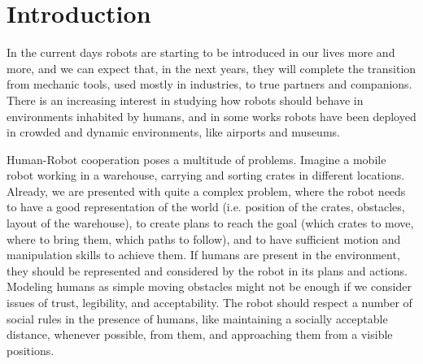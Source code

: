 
\chapter{Introduction} %

\label{chapter-introduction} %



In the current days robots are starting to be introduced in our lives more and more, and we can expect that, in the next years, they will complete the transition from mechanic tools, used mostly in industries, to true partners and companions. There is an increasing interest in studying how robots should behave in environments inhabited by humans, and in some works robots have been deployed in crowded and dynamic environments, like airports and museums.

Human-Robot cooperation poses a multitude of problems. Imagine a mobile robot working in a warehouse, carrying and sorting crates in different locations. Already, we are presented with quite a complex problem, where the robot needs to have a good representation of the world (i.e. position of the crates, obstacles, layout of the warehouse), to create plans to reach the goal (which crates to move, where to bring them, which paths to follow), and to have sufficient motion and manipulation skills to achieve them. If humans are present in the environment, they should be represented and considered by the robot in its plans and actions.  Modeling humans as simple moving obstacles might not be enough if we consider issues of trust, legibility, and acceptability. The robot should respect a number of social rules in the presence of humans, like maintaining a socially acceptable distance, whenever possible, from them, and approaching them from a visible positions.

